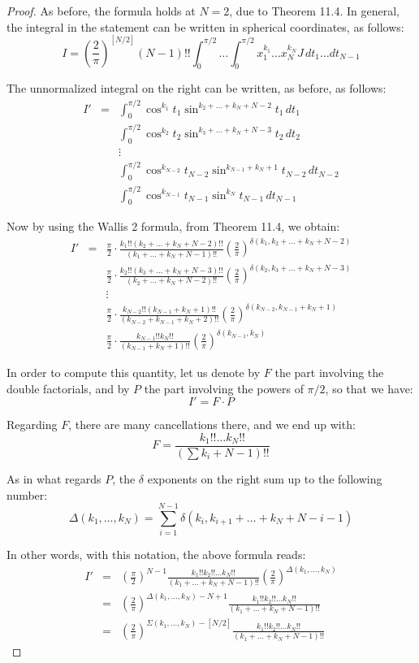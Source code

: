 \documentclass[12pt]{amsbook}
\begin{document}
\begin{proof}
As before, the formula holds at $N=2$, due to Theorem 11.4. In general, the integral in the statement can be written in spherical coordinates, as follows:
$$I=\left(\frac{2}{\pi}\right)^{[N/2]}(N-1)!!\int_0^{\pi/2}\ldots\int_0^{\pi/2}x_1^{k_1}\ldots x_N^{k_N}J\,dt_1\ldots dt_{N-1}$$

The unnormalized integral on the right can be written, as before, as follows:
\begin{eqnarray*}
I'
&=&\int_0^{\pi/2}\cos^{k_1}t_1\sin^{k_2+\ldots+k_N+N-2}t_1\,dt_1\\
&&\int_0^{\pi/2}\cos^{k_2}t_2\sin^{k_3+\ldots+k_N+N-3}t_2\,dt_2\\
&&\vdots\\
&&\int_0^{\pi/2}\cos^{k_{N-2}}t_{N-2}\sin^{k_{N-1}+k_N+1}t_{N-2}\,dt_{N-2}\\
&&\int_0^{\pi/2}\cos^{k_{N-1}}t_{N-1}\sin^{k_N}t_{N-1}\,dt_{N-1}
\end{eqnarray*}

Now by using the Wallis 2 formula, from Theorem 11.4, we obtain:
\begin{eqnarray*}
I'
&=&\frac{\pi}{2}\cdot\frac{k_1!!(k_2+\ldots+k_N+N-2)!!}{(k_1+\ldots+k_N+N-1)!!}\left(\frac{2}{\pi}\right)^{\delta(k_1,k_2+\ldots+k_N+N-2)}\\
&&\frac{\pi}{2}\cdot\frac{k_2!!(k_3+\ldots+k_N+N-3)!!}{(k_2+\ldots+k_N+N-2)!!}\left(\frac{2}{\pi}\right)^{\delta(k_2,k_3+\ldots+k_N+N-3)}\\
&&\vdots\\
&&\frac{\pi}{2}\cdot\frac{k_{N-2}!!(k_{N-1}+k_N+1)!!}{(k_{N-2}+k_{N-1}+k_N+2)!!}\left(\frac{2}{\pi}\right)^{\delta(k_{N-2},k_{N-1}+k_N+1)}\\
&&\frac{\pi}{2}\cdot\frac{k_{N-1}!!k_N!!}{(k_{N-1}+k_N+1)!!}\left(\frac{2}{\pi}\right)^{\delta(k_{N-1},k_N)}
\end{eqnarray*}

In order to compute this quantity, let us denote by $F$ the part involving the double factorials, and by $P$ the part involving the powers of $\pi/2$, so that we have:
$$I'=F\cdot P$$

Regarding $F$, there are many cancellations there, and we end up with:
$$F=\frac{k_1!!\ldots k_N!!}{(\sum k_i+N-1)!!}$$

As in what regards $P$, the $\delta$ exponents on the right sum up to the following number:
$$\Delta(k_1,\ldots,k_N)=\sum_{i=1}^{N-1}\delta(k_i,k_{i+1}+\ldots+k_N+N-i-1)$$

In other words, with this notation, the above formula reads:
\begin{eqnarray*}
I'
&=&\left(\frac{\pi}{2}\right)^{N-1}\frac{k_1!!k_2!!\ldots k_N!!}{(k_1+\ldots+k_N+N-1)!!}\left(\frac{2}{\pi}\right)^{\Delta(k_1,\ldots,k_N)}\\
&=&\left(\frac{2}{\pi}\right)^{\Delta(k_1,\ldots,k_N)-N+1}\frac{k_1!!k_2!!\ldots k_N!!}{(k_1+\ldots+k_N+N-1)!!}\\
&=&\left(\frac{2}{\pi}\right)^{\Sigma(k_1,\ldots,k_N)-[N/2]}\frac{k_1!!k_2!!\ldots k_N!!}{(k_1+\ldots+k_N+N-1)!!}
\end{eqnarray*}


\end{proof}
\end{document}
